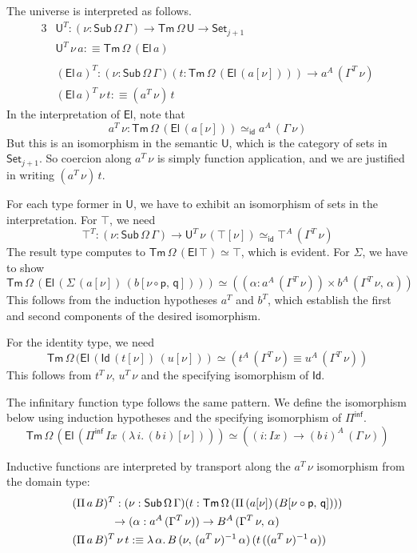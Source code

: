 \documentclass[12pt,a4paper,twoside,openany]{book}
\theoremstyle{remark}
\theoremstyle{definition}
\theoremstyle{theorem}
\newcommand{\mi}[1]{\mathit{#1}}
\newcommand{\id}{\mathsf{id}}
\newcommand{\Sub}{\mathsf{Sub}}
\newcommand{\Tm}{\mathsf{Tm}}
\newcommand{\U}{\mathsf{U}}
\newcommand{\El}{\mathsf{El}}
\newcommand{\Id}{\mathsf{Id}}
\newcommand{\Set}{\mathsf{Set}}
\newcommand{\Pii}{\Pi}
\newcommand{\Piinf}{\Pi^{\mathsf{inf}}}
\newcommand{\p}{\mathsf{p}}
\newcommand{\q}{\mathsf{q}}
\newcommand{\defn}{:\equiv}
\begin{document}
The universe is interpreted as follows.
\begin{alignat*}{3}
  &\U^T : (\nu : \Sub\,\Omega\,\Gamma) \to \Tm\,\Omega\,\U \to \Set_{j + 1} \\
  &\U^T\,\nu\,a \defn \Tm\,\Omega\,(\El\,a) \\
  &\\
  &(\El\,a)^T : (\nu : \Sub\,\Omega\,\Gamma)(t : \Tm\,\Omega\,(\El\,(a[\nu]))) \to a^A\,(\Gamma^T\,\nu)\\
  &(\El\,a)^T\,\nu\,t \defn (a^T\,\nu)\,t
\end{alignat*}
In the interpretation of $\El$, note that
\[
a^T\,\nu : \Tm\,\Omega\,(\El\,(a[\nu])) \simeq_{\id} a^A\,(\Gamma\,\nu)
\]
But this is an isomorphism in the semantic $\U$, which is the category of sets
in $\Set_{j + 1}$. So coercion along $a^T\,\nu$ is simply function application,
and we are justified in writing $(a^T\,\nu)\,t$.

For each type former in $\U$, we have to exhibit an isomorphism of sets in the
interpretation. For $\top$, we need
\[
  \top^T : (\nu : \Sub\,\Omega\,\Gamma) \to \U^T\,\nu\,(\top[\nu]) \simeq_{\id} \top^A\,(\Gamma^T\,\nu)
\]
The result type computes to $\Tm\,\Omega\,(\El\,\top) \simeq \top$, which is evident. For $\Sigma$, we
have to show
\[
   \Tm\,\Omega\,(\El\,(\Sigma\,(a[\nu])\,(b[\nu\circ\p,\,\q]))) \simeq ((\alpha : a^A\,(\Gamma^T\,\nu)) \times b^A\,(\Gamma^T\,\nu,\,\alpha))
\]
This follows from the induction hypotheses $a^T$ and $b^T$, which establish the
first and second components of the desired isomorphism.

For the identity type, we need
\[
  \Tm\,\Omega\,(\El\,(\Id\,(t[\nu])\,(u[\nu])) \simeq (t^A\,(\Gamma^T\,\nu) \equiv u^A\,(\Gamma^T\,\nu))
\]
This follows from $t^T\,\nu$, $u^T\,\nu$ and the specifying isomorphism of
$\Id$.

The infinitary function type follows the same pattern. We define the isomorphism
below using induction hypotheses and the specifying isomorphism of $\Piinf$.
\[
\Tm\,\Omega\,(\El\,(\Piinf\,\mi{Ix}\,(\lambda\,i.\,(b\,i)[\nu])))
\simeq
((i : \mi{Ix}) \to (b\,i)^A\,(\Gamma\,\nu))
\]

Inductive functions are interpreted by transport along the $a^T\,\nu$
isomorphism from the domain type:
\begin{alignat*}{3}
  &(\Pii\,a\,B)^T : (\nu : \Sub\,\Omega\,\Gamma)(t : \Tm\,\Omega\,(\Pii\,(a[\nu])\,(B[\nu\circ\p,\,\q])))\\
  & \hspace{3.5em}\to (\alpha : a^A\,(\Gamma^T\,\nu)) \to B^A\,(\Gamma^T\,\nu,\,\alpha)\\
  &(\Pii\,a\,B)^T\,\nu\,t \defn \lambda\,\alpha.\,
         B\,(\nu,\,(a^T\,\nu)^{-1}\,\alpha)\,(t\,((a^T\,\nu)^{-1}\,\alpha))
\end{alignat*}
\end{document}
